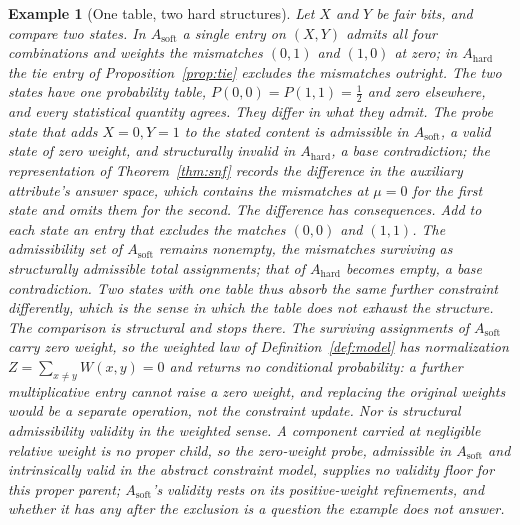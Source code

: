\documentclass[11pt]{article}
\newtheorem{example}{Example}
\begin{document}
\begin{example}[One table, two hard structures]\label{ex:twostates}
Let $X$ and $Y$ be fair bits, and compare two states. In $A_{\mathrm{soft}}$ a single entry on $(X, Y)$ admits all four combinations and weights the mismatches $(0,1)$ and $(1,0)$ at zero; in $A_{\mathrm{hard}}$ the tie entry of Proposition~\ref{prop:tie} excludes the mismatches outright. The two states have one probability table, $P(0,0) = P(1,1) = \tfrac12$ and zero elsewhere, and every statistical quantity agrees. They differ in what they admit. The probe state that adds $X = 0, Y = 1$ to the stated content is admissible in $A_{\mathrm{soft}}$, a valid state of zero weight, and structurally invalid in $A_{\mathrm{hard}}$, a base contradiction; the representation of Theorem~\ref{thm:snf} records the difference in the auxiliary attribute's answer space, which contains the mismatches at $\mu = 0$ for the first state and omits them for the second. The difference has consequences. Add to each state an entry that excludes the matches $(0,0)$ and $(1,1)$. The admissibility set of $A_{\mathrm{soft}}$ remains nonempty, the mismatches surviving as structurally admissible total assignments; that of $A_{\mathrm{hard}}$ becomes empty, a base contradiction. Two states with one table thus absorb the same further constraint differently, which is the sense in which the table does not exhaust the structure. The comparison is structural and stops there. The surviving assignments of $A_{\mathrm{soft}}$ carry zero weight, so the weighted law of Definition~\ref{def:model} has normalization $Z = \sum_{x \neq y} W(x, y) = 0$ and returns no conditional probability: a further multiplicative entry cannot raise a zero weight, and replacing the original weights would be a separate operation, not the constraint update. Nor is structural admissibility validity in the weighted sense. A component carried at negligible relative weight is no proper child, so the zero-weight probe, admissible in $A_{\mathrm{soft}}$ and intrinsically valid in the abstract constraint model, supplies no validity floor for this proper parent; $A_{\mathrm{soft}}$'s validity rests on its positive-weight refinements, and whether it has any after the exclusion is a question the example does not answer.

\end{example}
\end{document}
